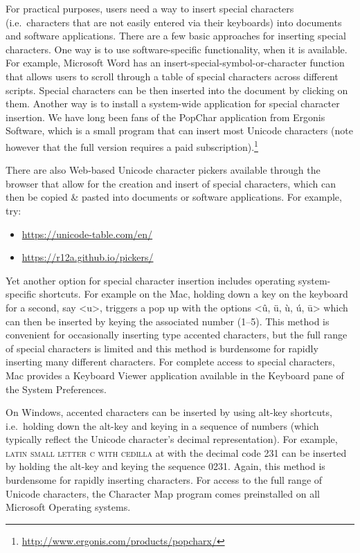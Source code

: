 For practical purposes, users need a way to insert special characters (i.e.\ characters that are not easily entered via their keyboards) into documents and software applications. There are a few basic approaches for inserting special characters. One way is to use software-specific functionality, when it is available. For example, Microsoft Word has an insert-special-symbol-or-character function that allows users to scroll through a table of special characters across different scripts. Special characters can be then inserted into the document by clicking on them. Another way is to install a system-wide application for special character insertion. We have long been fans of the PopChar application from Ergonis Software, which is a small program that can insert most Unicode characters (note however that the full version requires a paid subscription).\footnote{\url{http://www.ergonis.com/products/popcharx/}}

There are also Web-based Unicode character pickers available through the browser that allow for the creation and insert of special characters, which can then be copied \& pasted into documents or software applications. For example, try:

\begin{itemize}
	\item \url{https://unicode-table.com/en/}
	\item \url{https://r12a.github.io/pickers/}
\end{itemize}

Yet another option for special character insertion includes operating system-specific shortcuts. For example on the Mac, holding down a key on the keyboard for a second, say <u>, triggers a pop up with the options <û, ü, ù, ú, ū> which can then be inserted by keying the associated number (1--5). This method is convenient for occasionally inserting type accented characters, but the full range of special characters is limited and this method is burdensome for rapidly inserting many different characters. For complete access to special characters, Mac provides a Keyboard Viewer application available in the Keyboard pane of the System Preferences.

On Windows, accented characters can be inserted by using alt-key shortcuts, i.e.\ holding down the alt-key and keying in a sequence of numbers (which typically reflect the Unicode character's decimal representation). For example, \textsc{latin small letter c with cedilla} at  with the decimal code 231 can be inserted by holding the alt-key and keying the sequence 0231. Again, this method is burdensome for rapidly inserting characters. For access to the full range of Unicode characters, the Character Map program comes preinstalled on all Microsoft Operating systems.

